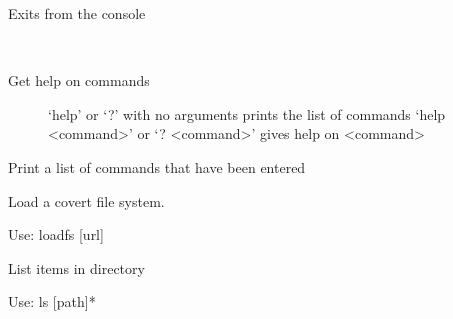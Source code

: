 \documentclass[letterpaper,10pt,english]{sphinxmanual}
\begin{document}
\begin{fulllineitems}

\begin{fulllineitems}
\label{main:main.Console.do_exit}
Exits from the console

\end{fulllineitems}


\begin{fulllineitems}
\label{main:main.Console.do_help}~\begin{description}
\item[{Get help on commands}] \leavevmode
`help' or `?' with no arguments prints the list of commands
`help \textless{}command\textgreater{}' or `? \textless{}command\textgreater{}' gives help on \textless{}command\textgreater{}

\end{description}

\end{fulllineitems}


\begin{fulllineitems}
\label{main:main.Console.do_hist}
Print a list of commands that have been entered

\end{fulllineitems}


\begin{fulllineitems}
\label{main:main.Console.do_loadfs}
Load a covert file system.

Use: loadfs {[}url{]}

\end{fulllineitems}


\begin{fulllineitems}
\label{main:main.Console.do_ls}
List items in directory

Use: ls {[}path{]}*

\end{fulllineitems}


\end{fulllineitems}
\end{document}
